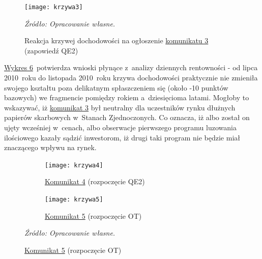 \vspace{0.25cm}
\hypertarget{fig6}{}
\begin{figure}[h]
\begin{centering}
  \texttt{[image: krzywa3]}
    \captionsetup{format=hang}
    \caption{Reakcja krzywej dochodowości na ogłoszenie \protect\hyperlink{kom3}{komunikatu 3} (zapowiedź QE2)}
\end{centering}
\begin{flushleft}
\hspace{1cm}\textit{\footnotesize{Źródło: Opracowanie własne.}} \\
\end{flushleft}
\vspace{-0.5cm}
\end{figure}

\hyperlink{fig6}{Wykres 6}~potwierdza wnioski płynące z~analizy dziennych rentowności - od lipca 2010~roku do listopada 2010~roku krzywa dochodowości praktycznie nie zmieniła swojego kształtu poza delikatnym spłaszczeniem się (około -10 punktów bazowych) we fragmencie pomiędzy rokiem a~dziesięcioma latami. Mogłoby to wskazywać, iż \hyperlink{kom3}{komunikat 3} był neutralny dla uczestników rynku dłużnych papierów skarbowych w~Stanach Zjednoczonych. Co oznacza, iż albo został on ujęty wcześniej w~cenach, albo obserwacje pierwszego programu luzowania ilościowego kazały sądzić inwestorom, iż drugi taki program nie będzie miał znaczącego wpływu na rynek.

\vspace{0.5cm}
\hypertarget{fig7}{}
\begin{figure}[H]
\centering
\captionsetup{format=hang}
\caption{Reakcje krzywych dochodowości na ogłoszenie komunikatów \protect\hyperlink{kom4}{4} oraz \protect\hyperlink{kom5}{5}}
\begin{subfigure}{.5\textwidth}
\hspace{-3cm}\texttt{[image: krzywa4]}
 \caption{\protect\hyperlink{kom4}{Komunikat 4} (rozpoczęcie QE2)}
\hypertarget{fig7}{}
\vspace*{\floatsep} %
\end{subfigure}
\begin{subfigure}{.5\textwidth}
\hspace{-3cm}\texttt{[image: krzywa5]}
\caption{\protect\hyperlink{kom5}{Komunikat 5} (rozpoczęcie OT)}
\end{subfigure}
\begin{flushleft}
\hspace{1cm}\textit{\footnotesize{Źródło: Opracowanie własne.}} \\
\end{flushleft}
\vspace{-0.5cm}
\end{figure}

